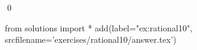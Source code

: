 
\begin{ex} 
  \label{ex:rational10}
  
  \qed
\end{ex} 
\begin{python0}
from solutions import *
add(label="ex:rational10",
    srcfilename='exercises/rational10/answer.tex') 
\end{python0}
